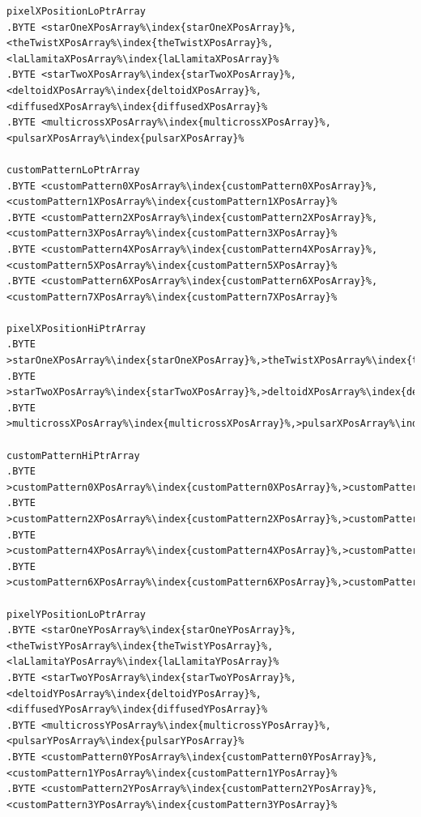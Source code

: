 \begin{minipage}[b]{0.33\linewidth}
\begin{lrbox}{\mybox}
\begin{lstlisting}[basicstyle=\ttfamily\tiny,escapechar=\%]
pixelXPositionLoPtrArray
.BYTE <starOneXPosArray%\index{starOneXPosArray}%,<theTwistXPosArray%\index{theTwistXPosArray}%,<laLlamitaXPosArray%\index{laLlamitaXPosArray}%
.BYTE <starTwoXPosArray%\index{starTwoXPosArray}%,<deltoidXPosArray%\index{deltoidXPosArray}%,<diffusedXPosArray%\index{diffusedXPosArray}%
.BYTE <multicrossXPosArray%\index{multicrossXPosArray}%,<pulsarXPosArray%\index{pulsarXPosArray}%

customPatternLoPtrArray
.BYTE <customPattern0XPosArray%\index{customPattern0XPosArray}%,<customPattern1XPosArray%\index{customPattern1XPosArray}%
.BYTE <customPattern2XPosArray%\index{customPattern2XPosArray}%,<customPattern3XPosArray%\index{customPattern3XPosArray}%
.BYTE <customPattern4XPosArray%\index{customPattern4XPosArray}%,<customPattern5XPosArray%\index{customPattern5XPosArray}%
.BYTE <customPattern6XPosArray%\index{customPattern6XPosArray}%,<customPattern7XPosArray%\index{customPattern7XPosArray}%

pixelXPositionHiPtrArray
.BYTE >starOneXPosArray%\index{starOneXPosArray}%,>theTwistXPosArray%\index{theTwistXPosArray}%,>laLlamitaXPosArray%\index{laLlamitaXPosArray}%
.BYTE >starTwoXPosArray%\index{starTwoXPosArray}%,>deltoidXPosArray%\index{deltoidXPosArray}%,>diffusedXPosArray%\index{diffusedXPosArray}%
.BYTE >multicrossXPosArray%\index{multicrossXPosArray}%,>pulsarXPosArray%\index{pulsarXPosArray}%

customPatternHiPtrArray
.BYTE >customPattern0XPosArray%\index{customPattern0XPosArray}%,>customPattern1XPosArray%\index{customPattern1XPosArray}%
.BYTE >customPattern2XPosArray%\index{customPattern2XPosArray}%,>customPattern3XPosArray%\index{customPattern3XPosArray}%
.BYTE >customPattern4XPosArray%\index{customPattern4XPosArray}%,>customPattern5XPosArray%\index{customPattern5XPosArray}%
.BYTE >customPattern6XPosArray%\index{customPattern6XPosArray}%,>customPattern7XPosArray%\index{customPattern7XPosArray}%

pixelYPositionLoPtrArray
.BYTE <starOneYPosArray%\index{starOneYPosArray}%,<theTwistYPosArray%\index{theTwistYPosArray}%,<laLlamitaYPosArray%\index{laLlamitaYPosArray}%
.BYTE <starTwoYPosArray%\index{starTwoYPosArray}%,<deltoidYPosArray%\index{deltoidYPosArray}%,<diffusedYPosArray%\index{diffusedYPosArray}%
.BYTE <multicrossYPosArray%\index{multicrossYPosArray}%,<pulsarYPosArray%\index{pulsarYPosArray}%
.BYTE <customPattern0YPosArray%\index{customPattern0YPosArray}%,<customPattern1YPosArray%\index{customPattern1YPosArray}%
.BYTE <customPattern2YPosArray%\index{customPattern2YPosArray}%,<customPattern3YPosArray%\index{customPattern3YPosArray}%

\end{lstlisting}
\end{lrbox}%
\scalebox{0.8}{\usebox{\mybox}}
\end{minipage}
